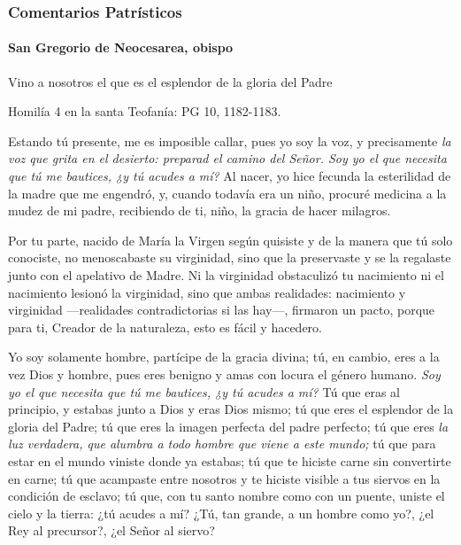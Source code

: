 \documentclass[]{article}
\let\oldparagraph\paragraph
\renewcommand{\paragraph}[1]{\oldparagraph{#1}\mbox{}}
\begin{document}
\subsubsection{Comentarios
Patrísticos}\label{comentarios-patruxedsticos-1}

\paragraph{San Gregorio de Neocesarea, obispo
}\label{san-gregorio-de-neocesarea-obispo}

Vino a nosotros el que es el esplendor de la gloria del Padre

Homilía 4 en la santa Teofanía: PG 10, 1182-1183.

Estando tú presente, me es imposible callar, pues yo soy la voz, y
precisamente \emph{la voz que grita en el desierto: preparad el camino
del Señor. Soy yo el que necesita que tú me bautices, ¿y tú acudes a
mí?} Al nacer, yo hice fecunda la esterilidad de la madre que me
engendró, y, cuando todavía era un niño, procuré medicina a la mudez de
mi padre, recibiendo de ti, niño, la gracia de hacer milagros.

Por tu parte, nacido de María la Virgen según quisiste y de la manera
que tú solo conociste, no menoscabaste su virginidad, sino que la
preservaste y se la regalaste junto con el apelativo de Madre. Ni la
virginidad obstaculizó tu nacimiento ni el nacimiento lesionó la
virginidad, sino que ambas realidades: nacimiento y virginidad
---realidades contradictorias si las hay---, firmaron un pacto, porque
para ti, Creador de la naturaleza, esto es fácil y hacedero.

Yo soy solamente hombre, partícipe de la gracia divina; tú, en cambio,
eres a la vez Dios y hombre, pues eres benigno y amas con locura el
género humano. \emph{Soy yo el que necesita que tú me bautices, ¿y tú
acudes a mí?} Tú que eras al principio, y estabas junto a Dios y eras
Dios mismo; tú que eres el esplendor de la gloria del Padre; tú que eres
la imagen perfecta del padre perfecto; tú que eres \emph{la luz
verdadera, que alumbra a todo hombre que viene a este mundo;} tú que
para estar en el mundo viniste donde ya estabas; tú que te hiciste carne
sin convertirte en carne; tú que acampaste entre nosotros y te hiciste
visible a tus siervos en la condición de esclavo; tú que, con tu santo
nombre como con un puente, uniste el cielo y la tierra: ¿tú acudes a mí?
¿Tú, tan grande, a un hombre como yo?, ¿el Rey al precursor?, ¿el Señor
al siervo?
\end{document}
